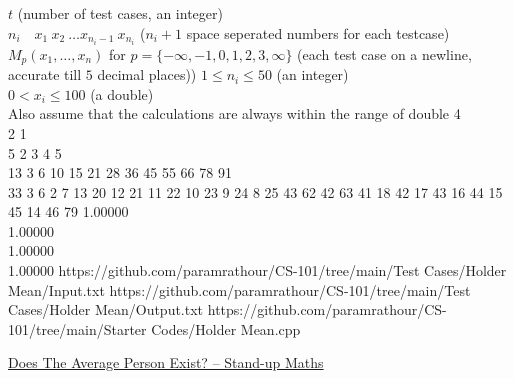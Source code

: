 \documentclass[../../Problems]{subfiles}
\begin{document}
\begin{testcasesMore}
	{$t$ \hfill(number of test cases, an integer)\\
	$n_i\quad x_1\ x_2\ \ldots x_{n_i-1}\ x_{n_i}$ \hfill($n_i+1$ space seperated numbers for each testcase)}
	{$M_{p}(x_{1},\dots ,x_{n})$ for $p=\{-\infty, -1, 0, 1, 2, 3, \infty\}$ \hfill{(each test case on a newline, accurate till $5$ decimal places))}}
	{$1 \leq n_i \leq 50$ \hfill{(an integer)}\\
	$0 < x_i \leq 100$ \hfill{(a double)}\\
	Also assume that the calculations are always within the range of double}
	{4\\2 1\\5 2 3 4 5\\13 3 6 10 15 21 28 36 45 55 66 78 91\\33 3 6 2 7 13 20 12 21 11 22 10 23 9 24 8 25 43 62 42 63 41 18 42 17 43 16 44 15 45 14 46 79}
	{1.00000\\1.00000\\1.00000\\1.00000}
	{https://github.com/paramrathour/CS-101/tree/main/Test Cases/Holder Mean/Input.txt}
	{https://github.com/paramrathour/CS-101/tree/main/Test Cases/Holder Mean/Output.txt}
	{https://github.com/paramrathour/CS-101/tree/main/Starter Codes/Holder Mean.cpp}
\end{testcasesMore}
\begin{funvideo}
\href{https://youtu.be/NbiveCNBOxk}{Does The Average Person Exist? -- Stand-up Maths}
\end{funvideo}
\end{document}
